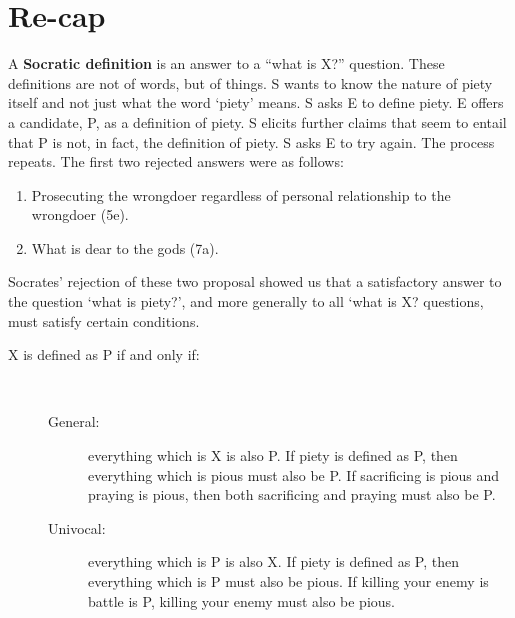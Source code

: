 \documentclass[oneside]{article}
\begin{document}
\section*{Re-cap}


A \textbf{Socratic definition} is an answer to a ``what is X?'' question. These definitions are not of words, but of things. S wants to know the nature of piety itself and not just what the word `piety' means. S asks E to define piety. E offers a candidate, P, as a definition of piety. S elicits further claims that seem to entail that P is not, in fact, the definition of piety. S asks E to try again. The process repeats. The first two rejected answers were as follows:

\begin{enumerate}
\item Prosecuting the wrongdoer regardless of personal relationship to the wrongdoer (5e).
\item What is dear to the gods (7a).
\end{enumerate}
Socrates' rejection of these two proposal showed us that a satisfactory answer to the question `what is piety?', and more generally to all `what is X? questions, must satisfy certain conditions.
\begin{description}
\item[ X is defined as P if and only if:]\
\begin{description}
\item[General:] everything which is X is also P. If piety is defined as P, then everything which is pious must also be P. If sacrificing is pious and praying is pious, then both sacrificing and praying must also be P. 
\item[Univocal:] everything which is P is also X. If piety is defined as P, then everything which is P must also be pious. If killing your enemy is battle is P, killing your enemy must also be pious. 
\end{description}
\end{description}
\end{document}
